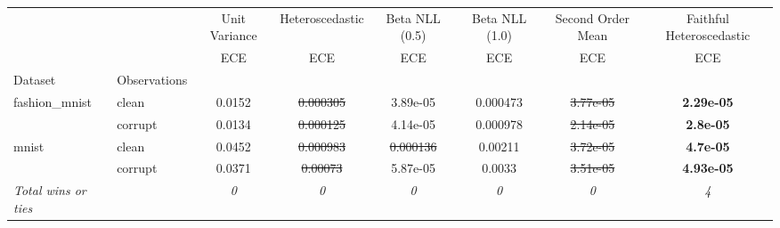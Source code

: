 \begin{tabular}{ll|c|c|c|c|c|c}
\toprule
{} & {} & {Unit Variance} & {Heteroscedastic} & {Beta NLL (0.5)} & {Beta NLL (1.0)} & {Second Order Mean} & {Faithful Heteroscedastic} \\
{} & {} & {ECE} & {ECE} & {ECE} & {ECE} & {ECE} & {ECE} \\
{Dataset} & {Observations} & {} & {} & {} & {} & {} & {} \\
\midrule
\multirow[t]{2}{*}{fashion_mnist} & clean & 0.0152 & \sout{0.000305} & 3.89e-05 & 0.000473 & \sout{3.77e-05} & \textbf{2.29e-05} \\
 & corrupt & 0.0134 & \sout{0.000125} & 4.14e-05 & 0.000978 & \sout{2.14e-05} & \textbf{2.8e-05} \\
\multirow[t]{2}{*}{mnist} & clean & 0.0452 & \sout{0.000983} & \sout{0.000136} & 0.00211 & \sout{3.72e-05} & \textbf{4.7e-05} \\
 & corrupt & 0.0371 & \sout{0.00073} & 5.87e-05 & 0.0033 & \sout{3.51e-05} & \textbf{4.93e-05} \\
\textit{{Total wins or ties}} &  & \textit{0} & \textit{0} & \textit{0} & \textit{0} & \textit{0} & \textit{4} \\
\bottomrule
\end{tabular}
